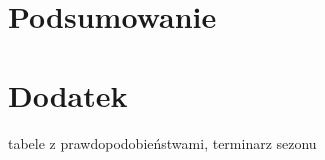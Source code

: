 \documentclass[inzynierska]{pwr_wmat_praca_dyplomowa}
\theoremstyle{plain}
\numberwithin{theorem}{chapter}
\theoremstyle{definition}
\numberwithin{theorem}{chapter}
\begin{document}
{\backmatter \chapter{Podsumowanie}}

{\backmatter \chapter{Dodatek}}
tabele z prawdopodobieństwami, terminarz sezonu

\newpage
\end{document}
